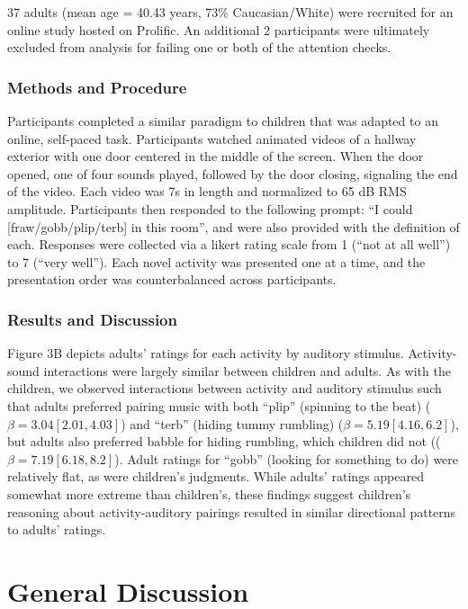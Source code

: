 \documentclass[10pt, letterpaper]{article}
\begin{document}
37 adults (mean age = 40.43 years, 73\% Caucasian/White) were recruited
for an online study hosted on Prolific. An additional 2 participants
were ultimately excluded from analysis for failing one or both of the
attention checks.

\hypertarget{methods-and-procedure}{%
\subsubsection{Methods and Procedure}\label{methods-and-procedure}}

Participants completed a similar paradigm to children that was adapted
to an online, self-paced task. Participants watched animated videos of a
hallway exterior with one door centered in the middle of the screen.
When the door opened, one of four sounds played, followed by the door
closing, signaling the end of the video. Each video was 7s in length and
normalized to 65 dB RMS amplitude. Participants then responded to the
following prompt: ``I could {[}fraw/gobb/plip/terb{]} in this room'',
and were also provided with the definition of each. Responses were
collected via a likert rating scale from 1 (``not at all well'') to 7
(``very well''). Each novel activity was presented one at a time, and
the presentation order was counterbalanced across participants.

\hypertarget{results-and-discussion-2}{%
\subsubsection{Results and Discussion}\label{results-and-discussion-2}}

Figure 3B depicts adults' ratings for each activity by auditory
stimulus. Activity-sound interactions were largely similar between
children and adults. As with the children, we observed interactions
between activity and auditory stimulus such that adults preferred
pairing music with both ``plip'' (spinning to the beat)
(\(\beta = 3.04 [2.01, 4.03]\)) and ``terb'' (hiding tummy rumbling)
(\(\beta = 5.19 [4.16, 6.2]\)), but adults also preferred babble for
hiding rumbling, which children did not ((\(\beta = 7.19 [6.18, 8.2]\)).
Adult ratings for ``gobb'' (looking for something to do) were relatively
flat, as were children's judgments. While adults' ratings appeared
somewhat more extreme than children's, these findings suggest children's
reasoning about activity-auditory pairings resulted in similar
directional patterns to adults' ratings.

\hypertarget{general-discussion}{%
\section{General Discussion}\label{general-discussion}}
\end{document}
